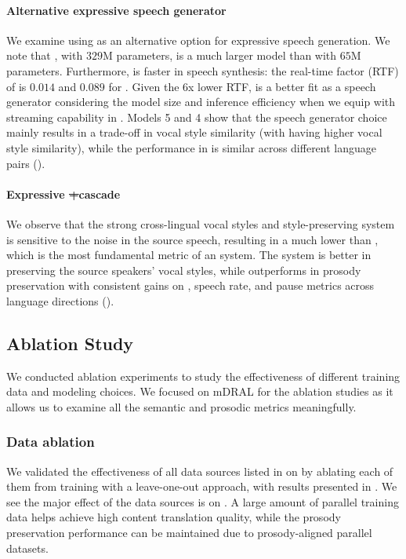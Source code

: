     
    \paragraph{Alternative expressive speech generator} We examine using \unitvb as an alternative option for expressive speech generation. We note that \unitvb, with $329$M parameters, is a much larger model than \ptv with $65$M parameters. Furthermore, \ptv is faster in speech synthesis: the real-time factor (RTF) of \ptv is $0.014$ and $0.089$ for \unitvb. Given the 6x lower RTF, \ptv is a better fit as a speech generator considering the model size and inference efficiency when we equip \seamlessexpressive with streaming capability in . Models 5 and 4 show that the speech generator choice mainly results in a trade-off in vocal style similarity (with \unitvb having higher vocal style similarity), while the performance in \comparator is similar across different language pairs ().
    \paragraph{Expressive \st+\tts cascade} We observe that the strong cross-lingual vocal styles and style-preserving \tts system is sensitive to the noise in the source speech, resulting in a much lower \asrbleu than \seamlessexpressive, which is the most fundamental metric of an \sst system. The \tts system is better in preserving the source speakers' vocal styles, while \seamlessexpressive outperforms in prosody preservation with consistent gains on \comparator, speech rate, and pause metrics across language directions ().


\subsection{Ablation Study}
We conducted ablation experiments to study the effectiveness of different training data and modeling choices.
We focused on mDRAL for the ablation studies as it allows us to examine all the semantic and prosodic metrics meaningfully. 

\subsubsection{Data ablation}
We validated the effectiveness of all data sources listed in  on \seamlessexpressive by ablating each of them from training with a leave-one-out approach, with results presented in .
We see the major effect of the data sources is on \asrbleu. A large amount of parallel training data helps achieve high content translation quality, while the prosody preservation performance can be maintained due to prosody-aligned parallel datasets.


